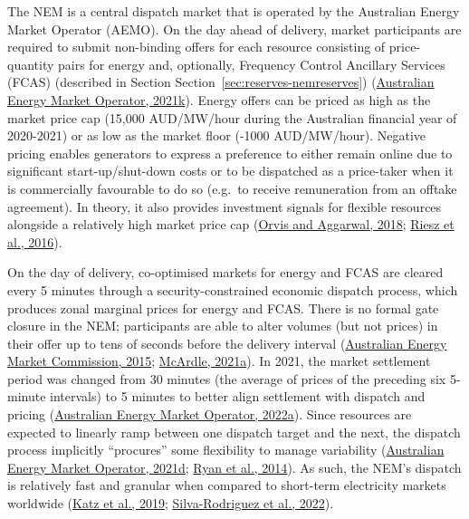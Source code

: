 \documentclass[12pt,a4paper,]{report}
\begin{document}
The NEM is a central dispatch market that is operated by the Australian
Energy Market Operator (AEMO). On the day ahead of delivery, market
participants are required to submit non-binding offers for each resource
consisting of price-quantity pairs for energy and, optionally, Frequency
Control Ancillary Services (FCAS) (described in Section
Section~\ref{sec:reserves-nemreserves})
(\protect\hyperlink{ref-australianenergymarketoperatorPredispatchOperatingProcedure2021}{Australian
Energy Market Operator, 2021k}). Energy offers can be priced as high as
the market price cap (15,000 AUD/MW/hour during the Australian financial
year of 2020-2021) or as low as the market floor (-1000 AUD/MW/hour).
Negative pricing enables generators to express a preference to either
remain online due to significant start-up/shut-down costs or to be
dispatched as a price-taker when it is commercially favourable to do so
(e.g.~to receive remuneration from an offtake agreement). In theory, it
also provides investment signals for flexible resources alongside a
relatively high market price cap
(\protect\hyperlink{ref-orvisRefiningCompetitiveElectricity2018}{Orvis
and Aggarwal, 2018};
\protect\hyperlink{ref-rieszAssessingViabilityEnergyonly2016}{Riesz et
al., 2016}).

On the day of delivery, co-optimised markets for energy and FCAS are
cleared every 5 minutes through a security-constrained economic dispatch
process, which produces zonal marginal prices for energy and FCAS. There
is no formal gate closure in the NEM; participants are able to alter
volumes (but not prices) in their offer up to tens of seconds before the
delivery interval
(\protect\hyperlink{ref-australianenergymarketcommissionBiddingGoodFaith2015}{Australian
Energy Market Commission, 2015};
\protect\hyperlink{ref-mcardleTwoRecentImprovements2021}{McArdle,
2021a}). In 2021, the market settlement period was changed from 30
minutes (the average of prices of the preceding six 5-minute intervals)
to 5 minutes to better align settlement with dispatch and pricing
(\protect\hyperlink{ref-australianenergymarketoperator5MSCommencement2022}{Australian
Energy Market Operator, 2022a}). Since resources are expected to
linearly ramp between one dispatch target and the next, the dispatch
process implicitly ``procures'' some flexibility to manage variability
(\protect\hyperlink{ref-australianenergymarketoperatorDispatchStandardOperating2019}{Australian
Energy Market Operator, 2021d};
\protect\hyperlink{ref-ryanVariableGenerationReserves2014}{Ryan et al.,
2014}). As such, the NEM's dispatch is relatively fast and granular when
compared to short-term electricity markets worldwide
(\protect\hyperlink{ref-katzOpeningMarketsDesigning2019}{Katz et al.,
2019};
\protect\hyperlink{ref-silva-rodriguezShortTermWholesale2022}{Silva-Rodriguez
et al., 2022}).
\end{document}
